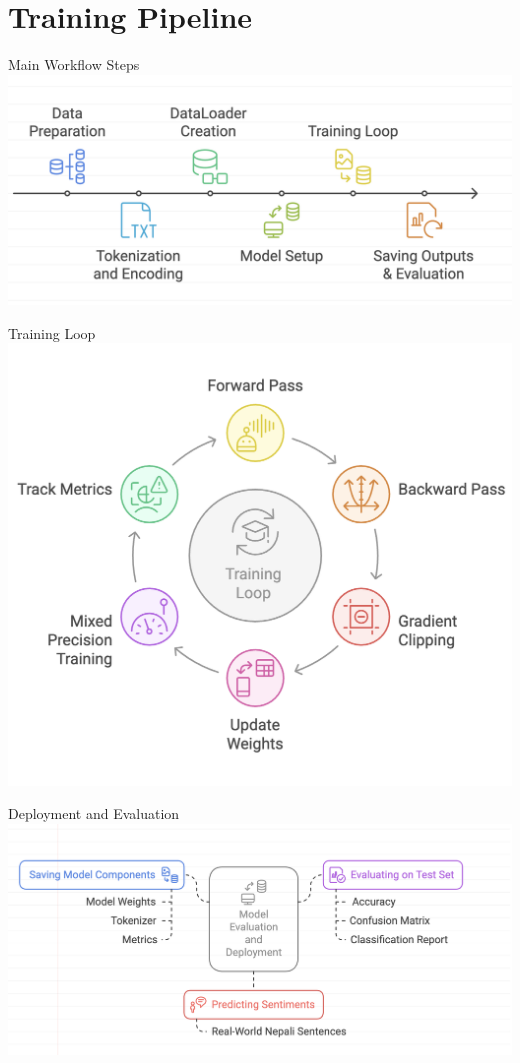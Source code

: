 \documentclass[aspectratio=169]{beamer}
\begin{document}
\section{Training Pipeline}
\begin{frame}{Main Workflow Steps}
  \centering
  \includegraphics[width=0.95\linewidth]{workflow.png}
\end{frame}

\begin{frame}{Training Loop}
  \centering
  \includegraphics[width=0.55\linewidth]{trainLoop.png}
\end{frame}

\begin{frame}{Deployment and Evaluation}
  \centering
  \includegraphics[width=0.95\linewidth]{deployment.png}
\end{frame}
\end{document}
